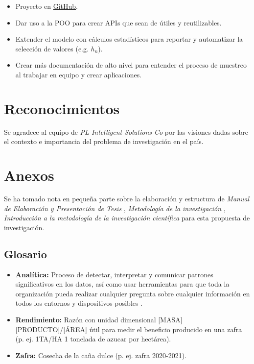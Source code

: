 \documentclass[conference]{IEEEtran}
\begin{document}
\begin{itemize}
    \item Proyecto en \href{https://github.com/tobiasbriones/cp-unah-mm700-agricultural-soil-sampling-for-data-analysis}{GitHub}.
    
    \item Dar uso a la POO para crear APIs que sean de útiles y reutilizables.
    
    \item Extender el modelo con cálculos estadísticos para reportar y automatizar la selección de valores (e.g. $h_n$).
    
    \item Crear más documentación de alto nivel para entender el proceso de muestreo al trabajar en equipo y crear aplicaciones.
\end{itemize}


\section{Reconocimientos}

Se agradece al equipo de \textit{PL Intelligent Solutions Co} por las visiones dadas sobre el contexto e importancia del problema de investigación en el país.




\section{Anexos}

Se ha tomado nota en pequeña parte sobre la elaboración y estructura de \textit{Manual de Elaboración y Presentación de Tesis} \cite{universidad-san-carlos-2016}, \textit{Metodología de la investigación} \cite{collado-2014}, \textit{Introducción a la metodología de la investigación científica} \cite{cabezas-2018} para esta propuesta de investigación.

\subsection{Glosario}

\begin{itemize}
    \item \textbf{Analítica:} Proceso de detectar, interpretar y comunicar patrones significativos en los datos, así como usar herramientas para que toda la organización pueda realizar cualquier pregunta sobre cualquier información en todos los entornos y dispositivos posibles \cite{oracle-2021}.

    \item \textbf{Rendimiento:} Razón con unidad dimensional [MASA][PRODUCTO]/[ÁREA] útil para medir el beneficio producido en una zafra (p. ej. 1TA/HA 1 tonelada de azucar por hectárea).

    \item \textbf{Zafra:} Cosecha de la caña dulce (p. ej. zafra 2020-2021).
\end{itemize}
\end{document}
